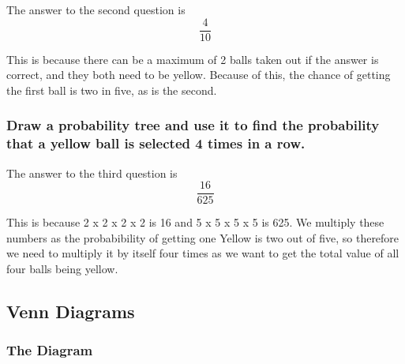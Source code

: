 \documentclass[a4paper,12pt]{article}
\begin{document}
The answer to the second question is $$\frac{4}{10}$$

This is because there can be a maximum of 2 balls taken out if the answer is correct, and they both need to be yellow. Because of this, the chance of getting the first ball is two in five, as is the second.

\subsubsection{Draw a probability tree and use it to find the probability that a yellow ball is selected 4 times in a row.}

The answer to the third question is $$\frac{16}{625}$$

This is because 2 x 2 x 2 x 2 is 16 and 5 x 5 x 5 x 5 is 625. We multiply these numbers as the probabibility of getting one Yellow is two out of five, so therefore we need to multiply it by itself four times as we want to get the total value of all four balls being yellow.

\newpage

\subsection{Venn Diagrams}

\subsubsection{The Diagram}


\def\firstcircle{(0,0) circle (1.5cm)}
\def\secondcircle{(55:2cm) circle (1.5cm)}
\def\thirdcircle{(0:2cm) circle (1.5cm)}
\def\forthcircle{(5,0.5) circle (1.5cm)}
\end{document}
